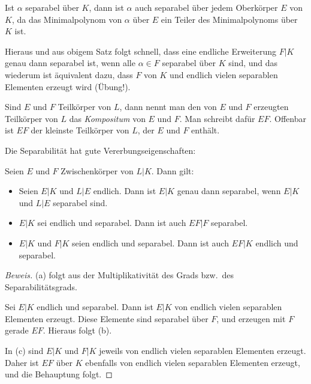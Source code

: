 \documentclass[12pt,a4paper,twoside]{article}
\newcommand{\ei}[1]{\emph{#1}\index{#1}}
\begin{document}
Ist $\alpha$ separabel \"uber $K$, dann ist $\alpha$ auch separabel \"uber
jedem Oberk\"orper $E$ von $K$, da das Minimalpolynom von $\alpha$ \"uber $E$
ein Teiler des Minimalpolynoms \"uber $K$ ist.

Hieraus und aus obigem Satz folgt schnell, dass eine endliche Erweiterung
$F|K$ genau dann separabel ist, wenn alle $\alpha\in F$ separabel \"uber $K$
sind, und das wiederum ist \"aquivalent dazu, dass $F$ von $K$ und endlich
vielen separablen Elementen erzeugt wird (\"Ubung!).

Sind $E$ und $F$ Teilk\"orper von $L$, dann nennt man den von $E$ und $F$
erzeugten Teilk\"orper von $L$ das \ei{Kompositum} von $E$ und $F$. Man
schreibt daf\"ur $EF$. Offenbar ist $EF$ der kleinste Teilk\"orper von $L$,
der $E$ und $F$ enth\"alt.

Die Separabilit\"at hat gute Vererbungseigenschaften:
\begin{Satz}
  Seien $E$ und $F$ Zwischenk\"orper von $L|K$. Dann gilt:
  \begin{itemize}
  \item[(a)] Seien $E|K$ und $L|E$ endlich. Dann ist $E|K$ genau dann
  separabel, wenn $E|K$ und $L|E$ separabel sind.
\item[(b)] $E|K$ sei endlich und separabel. Dann ist auch $EF|F$ separabel.
\item[(c)] $E|K$ und $F|K$ seien endlich und separabel. Dann ist auch $EF|K$
  endlich und separabel.
  \end{itemize}
\end{Satz}
\begin{proof}[Beweis]
  (a) folgt aus der Multiplikativit\"at des Grads bzw.\ des
  Separabilit\"atsgrads.

Sei $E|K$ endlich und separabel. Dann ist $E|K$ von endlich vielen separablen
Elementen erzeugt. Diese Elemente sind separabel \"uber $F$, und erzeugen mit
$F$ gerade $EF$. Hieraus folgt (b).

In (c) sind $E|K$ und $F|K$ jeweils von endlich vielen separablen Elementen
erzeugt. Daher ist $EF$ \"uber $K$ ebenfalls von endlich vielen separablen
Elementen erzeugt, und die Behauptung folgt.
\end{proof}
\end{document}
